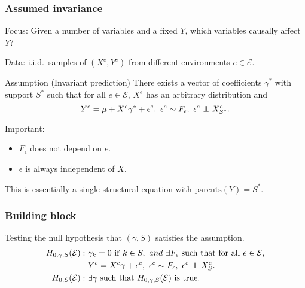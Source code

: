 \documentclass{beamer}
\newcommand\independent{\protect\mathpalette{\protect\independenT}{\perp}}
\def\independenT#1#2{\mathrel{\rlap{$#1#2$}\mkern2mu{#1#2}}}
\begin{document}
\begin{frame}
  \frametitle{Assumed invariance}
  Focus: Given a number of variables and a fixed $Y$, which variables
  causally affect $Y$?

  Data: i.i.d.\ samples of $(X^e,Y^e)$ from different environments $e
  \in \mathcal{E}$.

  \begin{block}{Assumption (Invariant prediction)}
    There exists a vector of coefficients $\gamma^{*}$ with support
    $S^{*}$ such that for all $e \in \mathcal{E}$, $X^e$ has an arbitrary
    distribution and
    \[
    Y^e = \mu + X^e \gamma^{*} + \epsilon^e,~\epsilon^e \sim
    F_{\epsilon},~\epsilon^e \independent X^e_{S^{*}}.
    \]
  \end{block}
  Important:
  \begin{itemize}
  \item $F_{\epsilon}$ does not depend on $e$.
  \item $\epsilon$ is always independent of $X$.
  \end{itemize}

  This is essentially a single structural equation with
  $\mathrm{parents}(Y) = S^{*}$.
\end{frame}

\begin{frame}
  \frametitle{Building block}
  Testing the null hypothesis that $(\gamma,S)$
  satisfies the assumption.
\[
\begin{split}
H_{0,\gamma,S}(\mathcal{E}):~&\gamma_k = 0~\mathrm{if}~k \in S,~and~
\exists F_{\epsilon} \mathrm{~such~that~for~all~} e \in \mathcal{E}, \\
  &Y^e = X^e \gamma + \epsilon^e,~\epsilon^e \sim F_{\epsilon},~ \epsilon^e \independent X^e_{S}.\\
H_{0,S}(\mathcal{E}):~&\exists \gamma \mathrm{~such~that~}
H_{0,\gamma,S}(\mathcal{E}) \mathrm{~is~true}.
\end{split}
\]
\end{frame}
\end{document}
